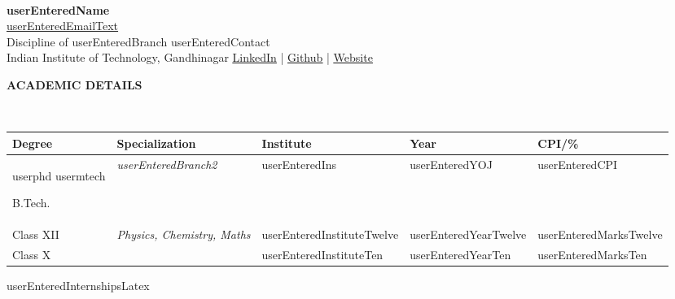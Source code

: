 \documentclass[a4paper,10pt]{article}
\newcommand{\lsep}{-0.6cm}
\newcommand{\resheading}[1]{%
    {\small
        \colorbox{mygrey}{%
            \begin{minipage}{0.965\textwidth}
                \textbf{#1 \vphantom{p\^{E}}}
            \end{minipage}%
        }%
    }%
}
\begin{document}
\hspace{0.75cm}\\[-0.54cm]

\textbf{{{userEnteredName}}} \\

\hfill
\href{mailto:{{userEnteredEmail}}}{{userEnteredEmailText}} \\

\indent Discipline of {{userEnteredBranch}}
\hfill
{{userEnteredContact}} \\

\indent Indian Institute of Technology, Gandhinagar
\hfill
\underline{\href{ {{userEnteredLinkedIn}} }{LinkedIn}} |
\underline{\href{ {{userEnteredGithub}} }{Github}} |
\underline{\href{ {{userEnteredWebsite}} }{Website}}
\\

\indent \resheading{ACADEMIC DETAILS}\\[\lsep]

\indent
\begin{tabular}{
    p{1.7cm}
    @{\hskip 0.08in} p{5.254cm}
    @{\hskip 0.08in} p{7.054cm}
    @{\hskip 0.09in} p{2.554cm}
    @{\hskip 0.08in} p{1.72cm}
}
\toprule
\textbf{Degree} &
\textbf{Specialization} &
\textbf{Institute} &
\textbf{Year} &
\textbf{CPI/\%} \\
\midrule

{{userphd}}
{{usermtech}}

B.Tech. &
\textit{{{userEnteredBranch2}}} &
{{userEnteredIns}} &
{{userEnteredYOJ}} &
{{userEnteredCPI}} \\

Class XII &
\textit{Physics, Chemistry, Maths} &
{{userEnteredInstituteTwelve}} &
{{userEnteredYearTwelve}} &
{{userEnteredMarksTwelve}} \\

Class X &
&
{{userEnteredInstituteTen}} &
{{userEnteredYearTen}} &
{{userEnteredMarksTen}} \\

\bottomrule
\end{tabular}

{{userEnteredInternshipsLatex}}
\end{document}
